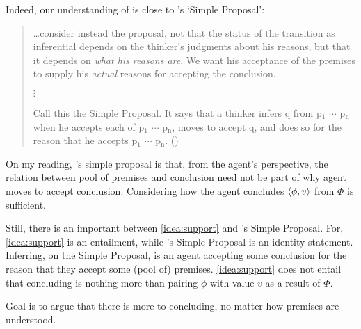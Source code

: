 \begin{note}
  Indeed, our understanding of \support{} is close to \citeauthor{Wright:2014tt}'s `Simple Proposal':
  \begin{quote}
    \dots consider instead the proposal, not that the status of the transition as inferential depends on the thinker's judgments about his reasons, but that it depends on \emph{what his reasons are}.
    We want his acceptance of the premises to supply his \emph{actual} reasons for accepting the conclusion.

    \mbox{}\hfill\(\vdots\)\hfill\mbox{}

    Call this the Simple Proposal.
    It says that a thinker infers q from p\(_{1}\) \(\cdots\) p\(_{\text{n}}\) when he accepts each of p\(_{1}\) \(\cdots\) p\(_{\text{n}}\), moves to accept q, and does so for the reason that he accepts p\(_{1}\) \(\cdots\) p\(_{\text{n}}\).%
    \mbox{}\hfill\mbox{(\citeyear[33]{Wright:2014tt})}
  \end{quote}

  On my reading, \citeauthor{Wright:2014tt}'s simple proposal is that, from the agent's perspective, the relation between pool of premises and conclusion need not be part of why agent moves to accept conclusion.
  Considering how the agent concludes \(\langle \phi, v \rangle\) from \(\Phi\) is sufficient.

  Still, there is an important between \autoref{idea:support} and \citeauthor{Wright:2014tt}'s Simple Proposal.
  For, \autoref{idea:support} is an entailment, while \citeauthor{Wright:2014tt}'s Simple Proposal is an identity statement.
  Inferring, on the Simple Proposal, is an agent accepting some conclusion for the reason that they accept some (pool of) premises.
  \autoref{idea:support} does not entail that concluding is nothing more than pairing \(\phi\) with value \(v\) as a result of \(\Phi\).

  Goal is to argue that there is more to concluding, no matter how premises are understood.
\end{note}

